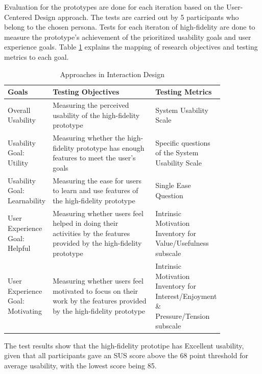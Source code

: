 \documentclass[conference]{IEEEtran}
\begin{document}
Evaluation for the prototypes are done for each iteration based on the User-Centered Design approach. The tests are carried out by 5 participants who belong to the chosen persona. Tests for each iteraton of high-fidelity are done to measure the prototype's achievement of the prioritized usability goals and user experience goals. Table \ref{tab:testing_metrics} explains the mapping of research objectives and testing metrics to each goal.

\RaggedLeft
\begin{table}[htbp]
  \caption{Approaches in Interaction Design \cite{saffer2010designing}}
  \begin{footnotesize}
    \begin{center}
      \begin{tabular}{|m{0.14\linewidth}|m{0.48\linewidth}|m{0.22\linewidth}|}
        \hline
      \textbf{Goals} & \textbf{Testing Objectives} & \textbf{Testing Metrics} \\ \hline
      Overall Usability & Measuring the perceived usability of the high-fidelity prototype & System Usability Scale \\ \hline
      Usability Goal: Utility & Measuring whether the high-fidelity prototype has enough features to meet the user's goals & Specific questions of the System Usability Scale \\ \hline
      Usability Goal: Learnability & Measuring the ease for users to learn and use features of the high-fidelity prototype & Single Ease Question \\ \hline
      User Experience Goal: Helpful & Measuring whether users feel helped in doing their activities by the features provided by the high-fidelity prototype & Intrinsic Motivation Inventory for Value/Usefulness subscale \\ \hline
      User Experience Goal: Motivating & Measuring whether users feel motivated to focus on their work by the features provided by the high-fidelity prototype & Intrinsic Motivation Inventory for Interest/Enjoyment \& Pressure/Tension subscale \\ \hline
    \end{tabular}
    \label{tab:testing_metrics}
  \end{center}
\end{footnotesize}
\end{table}
\justifying

The test results show that the high-fidelity prototipe has Excellent usability, given that all participants gave an SUS score above the 68 point threshold for average usability, with the lowest score being 85.
\end{document}
